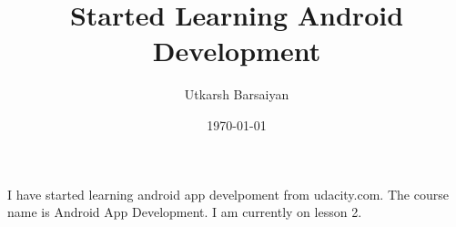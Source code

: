 \documentclass{article}
\title{Started Learning Android Development}
\author{Utkarsh Barsaiyan}
\date{\today}
\begin{document}
\maketitle
I have started learning android app develpoment from udacity.com. The course name is Android App Development. I am currently on lesson 2.
\end{document}
